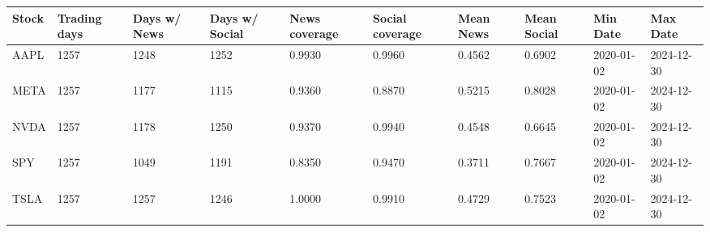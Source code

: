 \begin{tabular}{llllllllll}
\toprule
Stock & Trading days & Days w/ News & Days w/ Social & News coverage & Social coverage & Mean News & Mean Social & Min Date & Max Date \\
\midrule
AAPL & 1257 & 1248 & 1252 & 0.9930 & 0.9960 & 0.4562 & 0.6902 & 2020-01-02 & 2024-12-30 \\
META & 1257 & 1177 & 1115 & 0.9360 & 0.8870 & 0.5215 & 0.8028 & 2020-01-02 & 2024-12-30 \\
NVDA & 1257 & 1178 & 1250 & 0.9370 & 0.9940 & 0.4548 & 0.6645 & 2020-01-02 & 2024-12-30 \\
SPY & 1257 & 1049 & 1191 & 0.8350 & 0.9470 & 0.3711 & 0.7667 & 2020-01-02 & 2024-12-30 \\
TSLA & 1257 & 1257 & 1246 & 1.0000 & 0.9910 & 0.4729 & 0.7523 & 2020-01-02 & 2024-12-30 \\
\bottomrule
\end{tabular}
